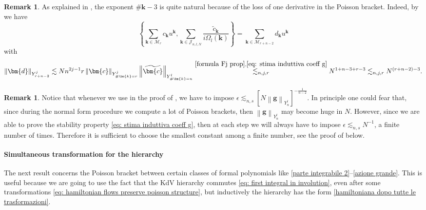 \documentclass[a4paper,10pt,reqno]{article}
\theoremstyle{definition}
\theoremstyle{plain}
\theoremstyle{plain}
\theoremstyle{definition}
\theoremstyle{plain}
\theoremstyle{plain}
\theoremstyle{plain}
\theoremstyle{definition}
\newtheorem{rem}[definition]{Remark}
\theoremstyle{definition}
\newcommand{\norm}[1]{\left\lVert #1 \right\rVert}
\def \k{\bm{k}}
\begin{document}
\begin{rem}
As explained in \cite[~Remark 3.11]{bernier}, the exponent $\#\k-3$ is quite natural because of the loss of one derivative in the Poisson bracket. Indeed, by  we have
\[
\left \{ \sum_{\k \in \mathcal{M}_r} c_{\k} u^{\k} , \sum_{\k \in \mathcal{J}_{n,l,N}} \frac{\widetilde{c}_{\k}}{i \Omega_l(\k)} \right \} = \sum_{\k \in \mathcal{M}_{r+n-2}} d_{\k} u^{\k}
\]
with
\[
\norm{\bm{d}}_{Y_{r+n-2}^j} \lesssim N n^{2j-1} r \norm{\bm{c}}_{Y_{\#\k = r}^j} \norm{\widetilde{\bm{c}}}_{Y_{\#\k = n}^{l}} \stackrel{\eqref{formula Fj prop},\eqref{eq: stima induttiva coeff g}}{\lesssim_{n,j,r}} N^{1+n-3+r-3} \lesssim_{n,j,r} N^{(r+n-2)-3}. 
\]
\end{rem}
\begin{rem} \label{rem: easy computations}
Notice that whenever we use  in the proof of , we have to impose $\epsilon \lesssim_{n,s} [N \norm{\bm{g}}_{Y_n^l}]^{-\frac{1}{n-2}}$.
In principle one could fear that, since during the normal form procedure we compute a lot of Poisson brackets, then $\norm{\bm{g}}_{Y_n^l}$ may become huge in $N$. 
However, since we are able to prove the stability property \eqref{eq: stima induttiva coeff g}, then at each step we will always have to impose $\epsilon \lesssim_{n,s} N^{-1}$, a finite number of times. Therefore it is sufficient to choose the smallest constant among a finite number, see the proof of  below.
\end{rem}

\paragraph{Simultaneous transformation for the hierarchy}
The next result concerns the Poisson bracket between certain classes of formal polynomials like \ref{parte integrabile 2}--\ref{azione grande}. This is useful because we are going to use the fact that the KdV hierarchy commutes \eqref{eq: first integral in involution}, even after some transformations \eqref{eq: hamiltonian flows preserve poisson structure}, but inductively the hierarchy has the form \eqref{hamiltoniana dopo tutte le trasformazioni}.
\end{document}

